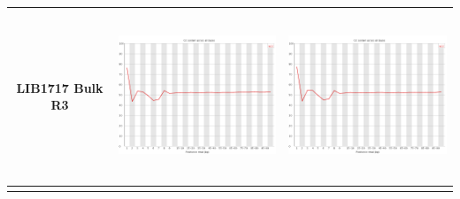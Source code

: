 \begin{center}
\begin{tabular}{ccc}
\begin{sideways}LIB1717 Bulk R3\end{sideways} & \includegraphics[height=5cm]{Appendices/images/Sample_LIB1717_base_gc_R1.png} & \includegraphics[height=5cm]{Appendices/images/Sample_LIB1717_base_gc_R2.png} \\ \midrule  \\

\end{tabular}
\end{center}


